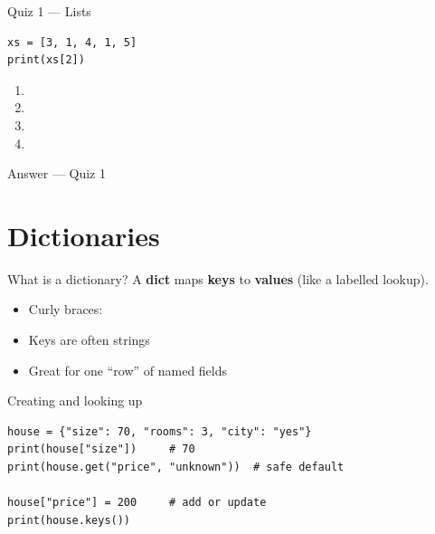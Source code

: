 \documentclass[aspectratio=169,11pt]{beamer}
\begin{document}
    \begin{frame}[fragile]{Quiz 1 --- Lists}
        \begin{lstlisting}
xs = [3, 1, 4, 1, 5]
print(xs[2])
        \end{lstlisting}
        \begin{enumerate}
            \item {}
            \item {}
            \item {}
            \item {}
        \end{enumerate}
        \quizpause
    \end{frame}

    \begin{frame}{Answer --- Quiz 1}
    \end{frame}

    \section{Dictionaries}

    \begin{frame}{What is a dictionary?}
        A \textbf{dict} maps \textbf{keys} to \textbf{values} (like a labelled lookup).
        \vspace{0.5em}
        \begin{itemize}
            \item Curly braces: 
            \item Keys are often strings
            \item Great for one ``row'' of named fields
        \end{itemize}
    \end{frame}

    \begin{frame}[fragile]{Creating and looking up}
        \begin{lstlisting}
house = {"size": 70, "rooms": 3, "city": "yes"}
print(house["size"])     # 70
print(house.get("price", "unknown"))  # safe default

house["price"] = 200     # add or update
print(house.keys())
        \end{lstlisting}
    \end{frame}
\end{document}
